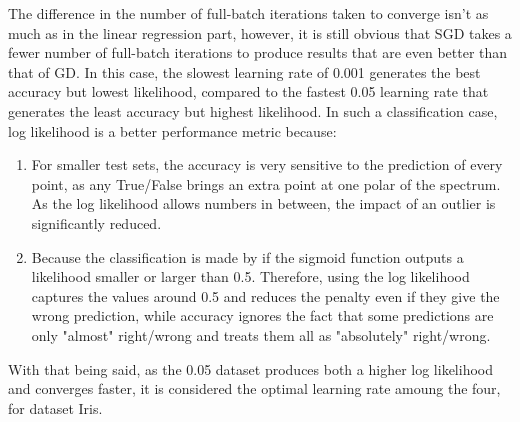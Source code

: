 \documentclass{article} %
\begin{document}
  \begin{table}[!h]
  \centering
  \caption{Iteration and performance with different learning rates, with the un-normalized loss function}
  \end{table}

  The difference in the number of full-batch iterations taken to converge isn't as much as in the linear regression part, however, it is still obvious that SGD takes a fewer number of full-batch iterations to produce results that are even better than that of GD. In this case, the slowest learning rate of 0.001 generates the best accuracy but lowest likelihood, compared to the fastest 0.05 learning rate that generates the least accuracy but highest likelihood. In such a classification case, log likelihood is a better performance metric because:
  \begin{enumerate}
    \item For smaller test sets, the accuracy is very sensitive to the prediction of every point, as any True/False brings an extra point at one polar of the spectrum. As the log likelihood allows numbers in between, the impact of an outlier is significantly reduced.
    \item Because the classification is made by if the sigmoid function outputs a likelihood smaller or larger than 0.5. Therefore, using the log likelihood captures the values around 0.5 and reduces the penalty even if they give the wrong prediction, while accuracy ignores the fact that some predictions are only "almost" right/wrong and treats them all as "absolutely" right/wrong.
  \end{enumerate}
  With that being said, as the 0.05 dataset produces both a higher log likelihood and converges faster, it is considered the optimal learning rate amoung the four, for dataset Iris.
\end{document}
